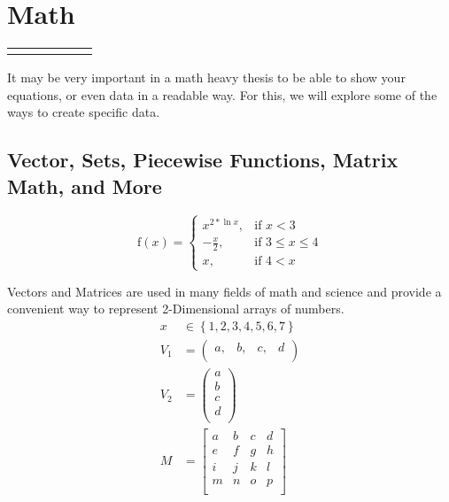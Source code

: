 	\section{Math}
		
		
		\begin{table}
			\begin{tabularx}{0.85\textwidth}{CCCCCC}
				\alpha
			\end{tabularx}
		\end{table}
  
		It may be very important in a math heavy thesis to be able to show your equations, or even data in a readable way. For this, we will explore some of the ways to create specific data.
    
        \subsection{Vector, Sets, Piecewise Functions, Matrix Math, and More}
        
			\begin{equation}
				\text{f}(x) = 
					\begin{cases}
						x^{2*\ln{x}},&\text{if }x<3\\
						-\frac{x}{2},&\text{if }3\leq{}x\leq{}4\\
						x,&\text{if }4<x
					\end{cases}
			\end{equation}
        
			Vectors and Matrices are used in many fields of math and science and provide a convenient way to represent 2-Dimensional arrays of numbers.
			\begin{align}
				x&\in{}\left\{1,2,3,4,5,6,7\right\}\\
				V_{1} &= {\left(
				\begin{array}{cccc}
					a, & b, & c, & d\\
				\end{array}
				\right)}\\
				V_{2} &= \left(
				\begin{array}{c}
					a \\
					b \\
					c \\
					d \\
				\end{array}
				\right)\\
				M &= {\left[
				\begin{array}{cccc}
					a & b & c & d\\
					e & f & g & h\\
					i & j & k & l\\
					m & n & o & p\\
				\end{array}
				\right]}
			\end{align}

	\printreferences %
